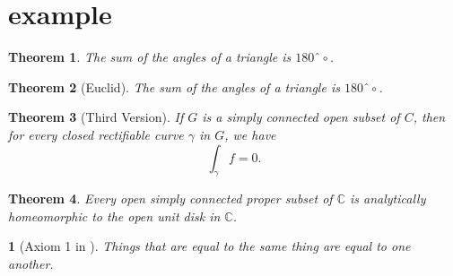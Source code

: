 \documentclass{article}
\theoremstyle{citing}
\newtheorem{cit}{}
\theoremstyle{newnonum}
\newtheorem{mythm}{Theorem}[section]
\begin{document}
\section{example}

\begin{mythm}
The sum of the angles of a triangle is $180ˆ\circ$.
\end{mythm}


\begin{mythm}[Euclid]
The sum of the angles of a triangle is $180ˆ\circ$.
\end{mythm}

\begin{mythm}[Third Version]
If $G$ is a simply connected open subset of ${C}$, then for every closed
rectifiable curve $\gamma$ in $G$, we have
\begin{equation*}
\int_\gamma f=0.
\end{equation*}
\end{mythm}

\begin{mythm}Every open simply connected proper subset of $\mathbb{C}$ is analytically
homeomorphic to the open unit disk in $\mathbb{C}$.
\end{mythm}

\begin{cit}[Axiom 1 in \cite{eu}]
Things that are equal to the same thing are equal to one another.
\end{cit}
\end{document}
